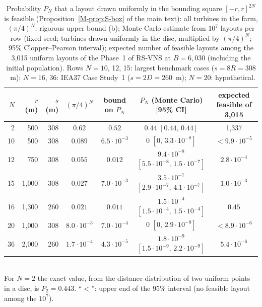 \begin{table}[!htbp]
\centering
\caption{Probability $P_N$ that a layout drawn uniformly in the bounding square $[-r,r]^{2N}$ is feasible (Proposition~\ref{M-prop:S-box} of the main text): all turbines in the farm, $(\pi/4)^N$; rigorous upper bound (b); Monte Carlo estimate from $10^7$ layouts per row (fixed seed; turbines drawn uniformly in the disc, multiplied by $(\pi/4)^N$; 95\% Clopper--Pearson interval); expected number of feasible layouts among the 3{,}015 uniform layouts of the Phase~1 of RS-VNS at $B=6{,}030$ (including the initial population). Rows $N=10$, 12, 15: largest benchmark cases ($s=8R=308$~m); $N=16$, 36: IEA37 Case Study~1 ($s=2D=260$~m); $N=20$: hypothetical.}
\label{tab:S-th-box}
\small\setlength{\tabcolsep}{4pt}
\begin{tabular}{rrrcccc}
\toprule
$N$ & $r$ (m) & $s$ (m) & $(\pi/4)^N$ & bound on $P_N$ & $P_N$ (Monte Carlo) [95\% CI] & expected feasible of 3{,}015\\
\midrule
2 & 500 & 308 & $0.62$ & $0.52$ & $0.44$ $[0.44,\,0.44]$ & 1{,}337 \\
10 & 500 & 308 & $0.089$ & $6.5\cdot10^{-3}$ & $0$ $[0,\,3.3\cdot10^{-8}]$ & $<9.9\cdot10^{-5}$ \\
12 & 750 & 308 & $0.055$ & $0.012$ & $9.4\cdot10^{-8}$ $[5.5\cdot10^{-8},\,1.5\cdot10^{-7}]$ & $2.8\cdot10^{-4}$ \\
15 & 1{,}000 & 308 & $0.027$ & $7.0\cdot10^{-3}$ & $3.5\cdot10^{-7}$ $[2.9\cdot10^{-7},\,4.1\cdot10^{-7}]$ & $1.0\cdot10^{-3}$ \\
16 & 1{,}300 & 260 & $0.021$ & $0.011$ & $1.5\cdot10^{-4}$ $[1.5\cdot10^{-4},\,1.5\cdot10^{-4}]$ & $0.45$ \\
20 & 1{,}000 & 308 & $8.0\cdot10^{-3}$ & $7.0\cdot10^{-4}$ & $0$ $[0,\,2.9\cdot10^{-9}]$ & $<8.9\cdot10^{-6}$ \\
36 & 2{,}000 & 260 & $1.7\cdot10^{-4}$ & $4.3\cdot10^{-5}$ & $1.8\cdot10^{-9}$ $[1.5\cdot10^{-9},\,2.2\cdot10^{-9}]$ & $5.4\cdot10^{-6}$ \\
\bottomrule
\end{tabular}
\\[2pt]{\footnotesize For $N=2$ the exact value, from the distance distribution of two uniform points in a disc, is $P_2=0.443$. ``$<$'': upper end of the 95\% interval (no feasible layout among the $10^7$).}
\end{table}

